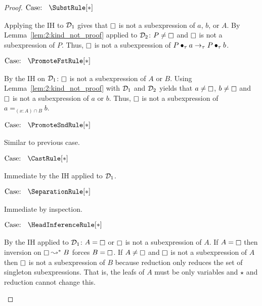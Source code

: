 \begin{proof}
    $\text{Case: }\begin{array}{c} \SubstRule[*] \end{array}$
    \begin{proofcase}
        Applying the IH to $\mathcal{D}_{1}$ gives that $\kind$ is not a subexpression of $a$, $b$, or $A$.
        By Lemma~\ref{lem:2:kind_not_proof} applied to $\mathcal{D}_{2}$: $P \neq \kind$ and $\kind$ is not a subexpression of $P$.
        Thus, $\kind$ is not a subexpression of $P \bullet_{\tau} a \to_\tau P \bullet_{\tau} b$.
    \end{proofcase}

    $\text{Case: }\begin{array}{c} \PromoteFstRule[*] \end{array}$
    \begin{proofcase}
        By the IH on $\mathcal{D}_{1}$: $\kind$ is not a subexpression of $A$ or $B$.
        Using Lemma~\ref{lem:2:kind_not_proof} with $\mathcal{D}_{1}$ and $\mathcal{D}_{2}$ yields that $a \neq \kind$, $b \neq \kind$ and $\kind$ is not a subexpression of $a$ or $b$.
        Thus, $\kind$ is not a subexpression of $a =_{(x : A) \cap B} b$.
    \end{proofcase}

    $\text{Case: }\begin{array}{c} \PromoteSndRule[*] \end{array}$
    \begin{proofcase}
        Similar to previous case.
    \end{proofcase}

    $\text{Case: }\begin{array}{c} \CastRule[*] \end{array}$
    \begin{proofcase}
        Immediate by the IH applied to $\mathcal{D}_{1}$.
    \end{proofcase}

    $\text{Case: }\begin{array}{c} \SeparationRule[*] \end{array}$
    \begin{proofcase}
        Immediate by inspection.
    \end{proofcase}

    $\text{Case: }\begin{array}{c} \HeadInferenceRule[*] \end{array}$
    \begin{proofcase}
        By the IH applied to $\mathcal{D}_{1}$: $A = \kind$ or $\kind$ is not a subexpression of $A$.
        If $A = \kind$ then inversion on $\kind \betastar B$ forces $B = \kind$.
        If $A \neq \kind$ and $\kind$ is not a subexpression of $A$ then $\kind$ is not a subexpression of $B$ because reduction only reduces the set of singleton subexpressions.
        That is, the leafs of $A$ must be only variables and $\star$ and reduction cannot change this.
    \end{proofcase}


\end{proof}
